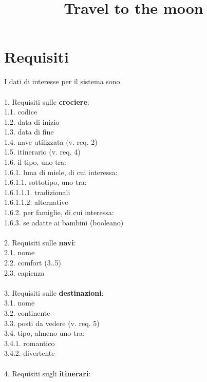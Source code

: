 \documentclass[12pt, letterpaper]{article}
\title{\textbf{Travel to the moon}}
\date{}
\newcommand{\acc}{\\\hphantom{}\\}
\begin{document}
\maketitle


\section{Requisiti}
I dati di interesse per il sistema sono \acc
1. Requisiti sulle \textbf{crociere}:\\
\hphantom{ident}1.1. codice \\
\hphantom{ident}1.2. data di inizio\\
\hphantom{ident}1.3. data di fine\\
\hphantom{ident}1.4. nave utilizzata (v. req. 2)\\
\hphantom{ident}1.5. itinerario (v. req. 4)\\
\hphantom{ident}1.6. il tipo, uno tra:\\
\hphantom{ident}\hphantom{ident}1.6.1. luna di miele, di cui interessa:\\
\hphantom{ident}\hphantom{ident}\hphantom{ident}1.6.1.1. sottotipo, uno tra:\\
\hphantom{ident}\hphantom{ident}\hphantom{ident}\hphantom{ident}1.6.1.1.1. tradizionali\\
\hphantom{ident}\hphantom{ident}\hphantom{ident}\hphantom{ident}1.6.1.1.2. alternative\\
\hphantom{ident}\hphantom{ident}\hphantom{ident}1.6.2. per famiglie, di cui interessa:\\
\hphantom{ident}\hphantom{ident}\hphantom{ident}\hphantom{ident}1.6.3. se adatte ai bambini (booleano)
\acc
2. Requisiti sulle \textbf{navi}:\\
\hphantom{ident}2.1. nome\\
\hphantom{ident}2.2. comfort (3..5)\\
\hphantom{ident}2.3. capienza
\acc
3. Requisiti sulle \textbf{destinazioni}:\\
\hphantom{ident}3.1. nome\\
\hphantom{ident}3.2. continente\\
\hphantom{ident}3.3. posti da vedere (v. req. 5)\\
\hphantom{ident}3.4. tipo, almeno uno tra:\\
\hphantom{ident}\hphantom{ident}3.4.1. romantico\\
\hphantom{ident}\hphantom{ident}3.4.2. divertente
\acc
4. Requisiti sugli \textbf{itinerari}:\\
\end{document}

